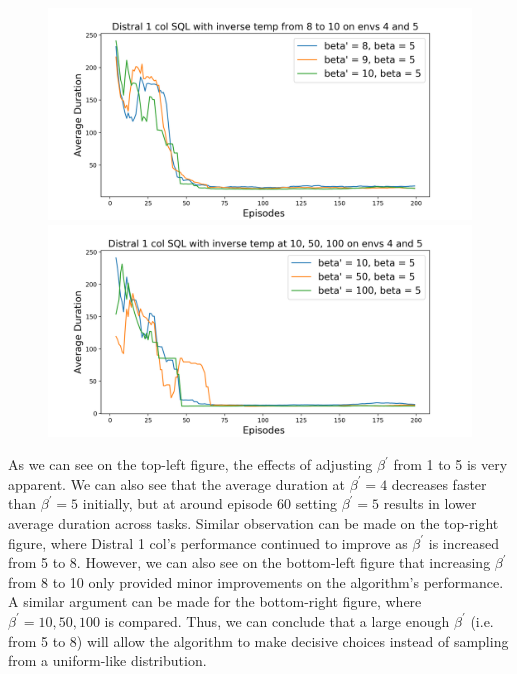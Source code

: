 \documentclass[12pt]{report}
\begin{document}
\begin{figure}[H]
\centering
\begin{minipage}{.5\textwidth}
\centering
\includegraphics[width=\textwidth]{figs/betas/d1_SQL_8_to_10_b_avg_dur.png}
\end{minipage}%
\centering
\begin{minipage}{.5\textwidth}
\centering
\includegraphics[width=\textwidth]{figs/betas/d1_SQL_large_b_avg_dur.png}
\end{minipage}%
\end{figure}
As we can see on the top-left figure, the effects of adjusting $\beta^\prime$ from 1 to 5 is very apparent. We can also see that the average duration at $\beta^\prime = 4$ decreases faster than $\beta^\prime = 5$ initially, but at around episode 60 setting $\beta^\prime = 5$ results in lower average duration across tasks. Similar observation can be made on the top-right figure, where Distral 1 col's performance continued to improve as $\beta^\prime$ is increased from 5 to 8. However, we can also see on the bottom-left figure that increasing $\beta^\prime$ from 8 to 10 only provided minor improvements on the algorithm's performance. A similar argument can be made for the bottom-right figure, where $\beta^\prime=10,50,100$ is compared. Thus, we can conclude that a large enough $\beta^\prime$ (i.e. from 5 to 8) will allow the algorithm to make decisive choices instead of sampling from a uniform-like distribution.\\
\end{document}
